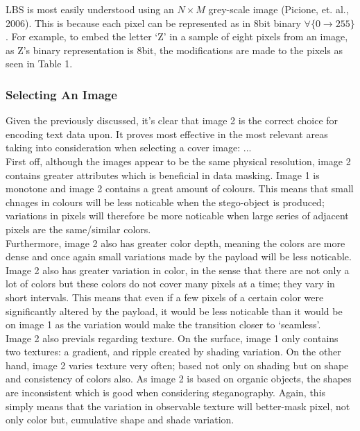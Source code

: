 \documentclass[11pt, english]{article}
\begin{document}
	LBS is most easily understood using an $N\times M$ grey-scale image (Picione, et. al., 2006). This is because each pixel can be represented as in 8bit binary $\forall\{0\longrightarrow255\}$. For example, to embed the letter `Z' in a sample of eight pixels from an image, as Z's binary representation is 8bit, the modifications are made to the pixels as seen in Table 1.

		\subsubsection{Selecting An Image}

	Given the previously discussed, it's clear that image 2 is the correct choice for encoding text data upon. It proves most effective in the most relevant areas taking into consideration when selecting a cover image: ...\\

	First off, although the images appear to be the same physical resolution, image 2 contains greater attributes which is beneficial in data masking. Image 1 is monotone and image 2 contains a great amount of colours. This means that small chnages in colours will be less noticable when the stego-object is produced; variations in pixels will therefore be more noticable when large series of adjacent pixels are the same/similar colors.\\

	Furthermore, image 2 also has greater color depth, meaning the colors are more dense and once again small variations made by the payload will be less noticable.\\

	Image 2 also has greater variation in color, in the sense that there are not only a lot of colors but these colors do not cover many pixels at a time; they vary in short intervals. This means that even if a few pixels of a certain color were significantly altered by the payload, it would be less noticable than it would be on image 1 as the variation would make the transition closer to `seamless'.\\

	Image 2 also previals regarding texture. On the surface, image 1 only contains two textures: a gradient, and ripple created by shading variation. On the other hand, image 2 varies texture very often; based not only on shading but on shape and consistency of colors also. As image 2 is based on organic objects, the shapes are inconsistent which is good when considering steganography. Again, this simply means that the variation in observable texture will better-mask pixel, not only color but, cumulative shape and shade variation.
\end{document}

